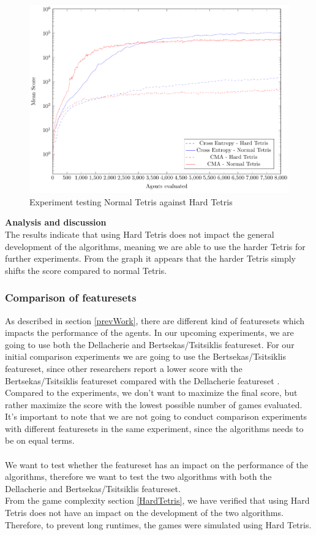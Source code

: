 \begin{figure}[H]
\centering
\includegraphics[scale=1]{data/complexity/mean/PlotFile.pdf}
\caption{Experiment testing Normal Tetris against Hard Tetris}
\end{figure}

\textbf{Analysis and discussion}\\
The results indicate that using Hard Tetris does not impact the general development of the algorithms, meaning we are able to use the harder Tetris for further experiments. From the graph it appears that the harder Tetris simply shifts the score compared to normal Tetris.
\\


\subsubsection{Comparison of featuresets  \label{compoffeatureset}}
As described in section \ref{prevWork}, there are different kind of featuresets which
impacts the performance of the agents. In our upcoming experiments, we are going to
use both the Dellacherie and Bertsekas/Tsitsiklis featureset. For our initial comparison experiments
we are going to use the Bertsekas/Tsitsiklis featureset, since other researchers report
a lower score with the Bertsekas/Tsitsiklis featureset compared with the Dellacherie featureset
\citep{thiery:09}. Compared to the \citep{thiery:09} experiments, we don't want to maximize the
final score, but rather maximize the score with the lowest possible number of 
games evaluated.\\
It's important to note that we are not going to conduct comparison experiments with different
featuresets in the same experiment, since the algorithms needs to be on equal terms.\\
\\
We want to test whether the featureset has an impact on the performance of the algorithms,
therefore we want to test the two algorithms with both the Dellacherie and Bertsekas/Tsitsiklis featureset.\\
From the game complexity section \ref{HardTetris}, we have verified that using Hard Tetris
\citep{boumaza2009} does not have an impact on the development of the two algorithms.
Therefore, to prevent long runtimes, the games were simulated
using Hard Tetris.\\

